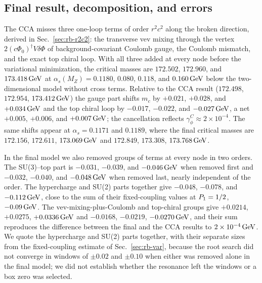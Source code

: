 \subsection{Final result, decomposition, and errors}
\label{sec:rb-xfinal}

The CCA misses three one-loop terms of order $r^2c^2$ along the broken direction, derived in Sec.~\ref{sec:rb-r2c2}: the transverse vev mixing through the vertex $2(c\Phi_0)^\dagger V\delta\Phi$ of background-covariant Coulomb gauge, the Coulomb mismatch, and the exact top chiral loop.
With all three added at every node before the variational minimization, the critical masses are $172.502$, $172.960$, and $173.418\,\mathrm{GeV}$ at $\alpha_s(M_Z)=0.1180$, $0.080$, $0.118$, and $0.160\,\mathrm{GeV}$ below the two-dimensional model without cross terms. %
Relative to the CCA result ($172.498$, $172.954$, $173.412\,\mathrm{GeV}$) the gauge part shifts $m_c$ by $+0.021$, $+0.028$, and $+0.034\,\mathrm{GeV}$ and the top chiral loop by $-0.017$, $-0.022$, and $-0.027\,\mathrm{GeV}$, a net $+0.005$, $+0.006$, and $+0.007\,\mathrm{GeV}$; the cancellation reflects $\gamma_\phi^C\approx2\times10^{-4}$. %
The same shifts appear at $\alpha_s=0.1171$ and $0.1189$, where the final critical masses are $172.156$, $172.611$, $173.069\,\mathrm{GeV}$ and $172.849$, $173.308$, $173.768\,\mathrm{GeV}$. %

In the final model we also removed groups of terms at every node in two orders.
The SU(3)--top part is $-0.031$, $-0.039$, and $-0.046\,\mathrm{GeV}$ when removed first and $-0.032$, $-0.040$, and $-0.048\,\mathrm{GeV}$ when removed last, nearly independent of the order. %
The hypercharge and SU(2) parts together give $-0.048$, $-0.078$, and $-0.112\,\mathrm{GeV}$, close to the sum of their fixed-coupling values at $P_1=1/2$, $-0.09\,\mathrm{GeV}$. %
The vev-mixing-plus-Coulomb and top-chiral groups give $+0.0214$, $+0.0275$, $+0.0336\,\mathrm{GeV}$ and $-0.0168$, $-0.0219$, $-0.0270\,\mathrm{GeV}$, and their sum reproduces the difference between the final and the CCA results to $2\times10^{-4}\,\mathrm{GeV}$. %
We quote the hypercharge and SU(2) parts together, with their separate sizes from the fixed-coupling estimate of Sec.~\ref{sec:rb-var}, because the root search did not converge in windows of $\pm0.02$ and $\pm0.10$ when either was removed alone in the final model; we did not establish whether the resonance left the windows or a box zero was selected. %

